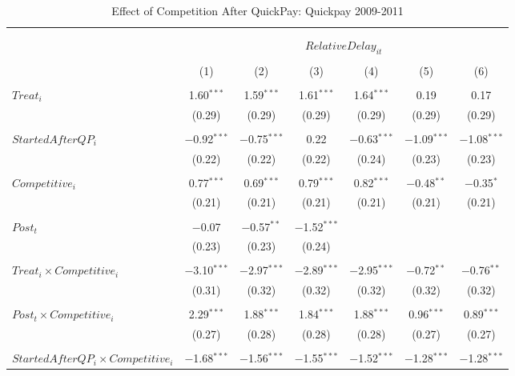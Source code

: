 \documentclass[
]{article}
\begin{document}
\begin{table}[H] \centering 
  \caption{Effect of Competition After QuickPay: Quickpay 2009-2011} 
  \label{} 
\small 
\begin{tabular}{@{\extracolsep{-3pt}}lcccccc} 
\\[-1.8ex]\hline 
\hline \\[-1.8ex] 
\\[-1.8ex] & \multicolumn{6}{c}{$RelativeDelay_{it}$  } \\ 
\\[-1.8ex] & (1) & (2) & (3) & (4) & (5) & (6)\\ 
\hline \\[-1.8ex] 
 $Treat_i$ & 1.60$^{***}$ & 1.59$^{***}$ & 1.61$^{***}$ & 1.64$^{***}$ & 0.19 & 0.17 \\ 
  & (0.29) & (0.29) & (0.29) & (0.29) & (0.29) & (0.29) \\ 
  & & & & & & \\ 
 $StartedAfterQP_i$ & $-$0.92$^{***}$ & $-$0.75$^{***}$ & 0.22 & $-$0.63$^{***}$ & $-$1.09$^{***}$ & $-$1.08$^{***}$ \\ 
  & (0.22) & (0.22) & (0.22) & (0.24) & (0.23) & (0.23) \\ 
  & & & & & & \\ 
 $Competitive_i$ & 0.77$^{***}$ & 0.69$^{***}$ & 0.79$^{***}$ & 0.82$^{***}$ & $-$0.48$^{**}$ & $-$0.35$^{*}$ \\ 
  & (0.21) & (0.21) & (0.21) & (0.21) & (0.21) & (0.21) \\ 
  & & & & & & \\ 
 $Post_t$ & $-$0.07 & $-$0.57$^{**}$ & $-$1.52$^{***}$ &  &  &  \\ 
  & (0.23) & (0.23) & (0.24) &  &  &  \\ 
  & & & & & & \\ 
 $Treat_i \times Competitive_i$ & $-$3.10$^{***}$ & $-$2.97$^{***}$ & $-$2.89$^{***}$ & $-$2.95$^{***}$ & $-$0.72$^{**}$ & $-$0.76$^{**}$ \\ 
  & (0.31) & (0.32) & (0.32) & (0.32) & (0.32) & (0.32) \\ 
  & & & & & & \\ 
 $Post_t \times Competitive_i$ & 2.29$^{***}$ & 1.88$^{***}$ & 1.84$^{***}$ & 1.88$^{***}$ & 0.96$^{***}$ & 0.89$^{***}$ \\ 
  & (0.27) & (0.28) & (0.28) & (0.28) & (0.27) & (0.27) \\ 
  & & & & & & \\ 
 $StartedAfterQP_i \times Competitive_i$ & $-$1.68$^{***}$ & $-$1.56$^{***}$ & $-$1.55$^{***}$ & $-$1.52$^{***}$ & $-$1.28$^{***}$ & $-$1.28$^{***}$ \\ 

\end{tabular}
\end{table}
\end{document}
